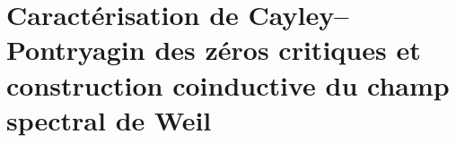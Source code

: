 \HMTFlushCurrentChapter
\chapter{Caractérisation de Cayley--Pontryagin des zéros critiques et construction coinductive du champ spectral de Weil}
\begingroup
\renewcommand{\chapter}[2][]{}%

\endgroup


\HMTFlushCurrentChapter
\chapter{Régularité globale de Navier--Stokes par contrôle solénoïdal, transport de frontière et estimation coercive}
\begingroup
\renewcommand{\chapter}[2][]{}%

\endgroup

\HMTFlushCurrentChapter
\chapter{Existence quantique et écart de masse de Yang--Mills par coercivité de jauge et positivité spectrale}
\begingroup
\renewcommand{\chapter}[2][]{}%

\endgroup


\HMTFlushCurrentChapter
\chapter{Réalisation algébrique des classes de Hodge par projecteurs cohomologiques compatibles et descente rationnelle}
\begingroup
\renewcommand{\chapter}[2][]{}%

\endgroup


